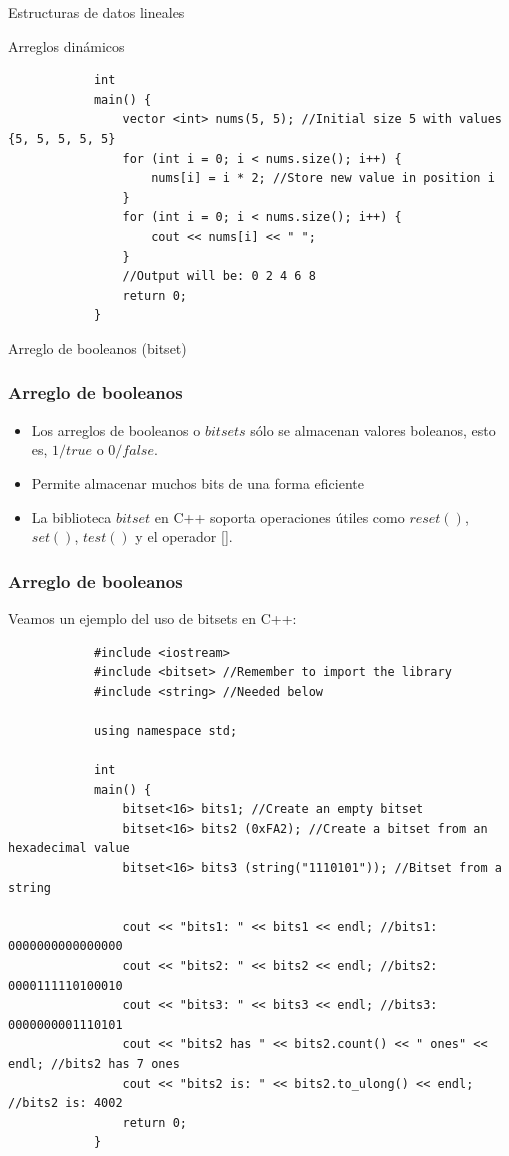 \documentclass{beamer}
\begin{document}
\begin{section}{Estructuras de datos lineales}
\begin{subsection}{Arreglos dinámicos}
\begin{frame}[fragile]
\begin{lstlisting}
			int
			main() {
			    vector <int> nums(5, 5); //Initial size 5 with values {5, 5, 5, 5, 5}
			    for (int i = 0; i < nums.size(); i++) {
			        nums[i] = i * 2; //Store new value in position i
			    }
			    for (int i = 0; i < nums.size(); i++) {
			        cout << nums[i] << " ";
			    }
			    //Output will be: 0 2 4 6 8
			    return 0;
			}
		\end{lstlisting}
	\end{frame}
\end{subsection}
\begin{subsection}{Arreglo de booleanos (bitset)}
	\begin{frame}[fragile]
		\frametitle{Arreglo de booleanos}
		\begin{itemize}
			\item {Los arreglos de booleanos o $bitsets$ sólo se almacenan valores boleanos, esto es, $1/true$ o $0/false$.}
			\item {Permite almacenar muchos bits de una forma eficiente}
			\item {La biblioteca $bitset$ en C++ soporta operaciones útiles como $reset()$, $set()$, $test()$ y el operador [].}
		\end{itemize}
	\end{frame}
	
	\begin{frame}[fragile]
		\frametitle{Arreglo de booleanos}
		Veamos un ejemplo del uso de bitsets en C++:
		\begin{lstlisting}
			#include <iostream>
			#include <bitset> //Remember to import the library
			#include <string> //Needed below

			using namespace std;
			
			int
			main() {
			    bitset<16> bits1; //Create an empty bitset
			    bitset<16> bits2 (0xFA2); //Create a bitset from an hexadecimal value
			    bitset<16> bits3 (string("1110101")); //Bitset from a string
			    
			    cout << "bits1: " << bits1 << endl; //bits1: 0000000000000000
			    cout << "bits2: " << bits2 << endl; //bits2: 0000111110100010
			    cout << "bits3: " << bits3 << endl; //bits3: 0000000001110101
			    cout << "bits2 has " << bits2.count() << " ones" << endl; //bits2 has 7 ones
			    cout << "bits2 is: " << bits2.to_ulong() << endl; //bits2 is: 4002
			    return 0;
			}
		\end{lstlisting}
	\end{frame}
\end{subsection}


\end{section}
\end{document}
